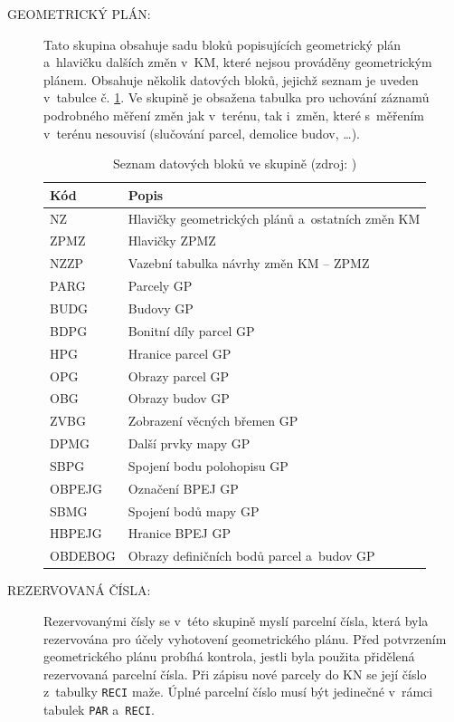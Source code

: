 \documentclass[a4paper,12pt,oneside]{book}
\begin{document}
\begin{description}
 \item[GEOMETRICKÝ PLÁN:] Tato skupina obsahuje sadu bloků popisujících geometrický plán a~hlavičku dalších změn v~KM, které nejsou prováděny geometrickým plánem. Obsahuje několik datových bloků, jejichž seznam je uveden v~tabulce č. \ref{t_skupina_gp}. Ve skupině je obsažena tabulka pro uchování záznamů podrobného měření změn jak v~terénu, tak i~změn, které s~měřením v~terénu nesouvisí (slučování parcel, demolice budov, \dots). \cite{dp_landa} \cite{vfk_struktura}

\begin{table}[htbp]
\centering
\caption[Seznam datových bloků ve skupině ]{Seznam datových bloků ve skupině  (zdroj: \cite{vfk_struktura})}
\begin{tabular}{ll}
\toprule
\textbf{Kód} & \textbf{Popis} \\ 
\midrule
NZ & Hlavičky geometrických plánů a~ostatních změn KM \\ 
ZPMZ & Hlavičky ZPMZ \\ 
NZZP & Vazební tabulka návrhy změn KM -- ZPMZ \\ 
PARG & Parcely GP \\ 
BUDG & Budovy GP \\ 
BDPG & Bonitní díly parcel GP \\ 
HPG & Hranice parcel GP \\ 
OPG & Obrazy parcel GP \\ 
OBG & Obrazy budov GP \\ 
ZVBG & Zobrazení věcných břemen GP \\ 
DPMG & Další prvky mapy GP \\ 
SBPG & Spojení bodu polohopisu GP \\ 
OBPEJG & Označení BPEJ GP \\ 
SBMG & Spojení bodů mapy GP \\ 
HBPEJG & Hranice BPEJ GP \\ 
OBDEBOG & Obrazy definičních bodů parcel a~budov GP \\ 
\bottomrule
\end{tabular}
\label{t_skupina_gp}
\end{table}

 \newpage
 \item[REZERVOVANÁ ČÍSLA:] Rezervovanými čísly se v~této skupině myslí parcelní čísla, která byla rezervována pro účely vyhotovení geometrického plánu. Před potvrzením geometrického plánu probíhá kontrola, jestli byla použita přidělená rezervovaná parcelní čísla. Při zápisu nové parcely do KN se její číslo z~tabulky \texttt{RECI} maže. Úplné parcelní číslo musí být jedinečné v~rámci tabulek \texttt{PAR} a~\texttt{RECI}. 
 

\end{description}
\end{document}

